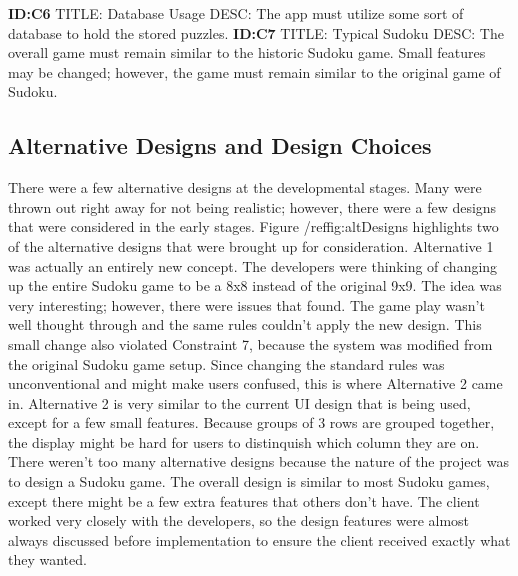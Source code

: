 \documentclass{article}
\begin{document}
\textbf{ID:C6} \newline TITLE: Database Usage \newline DESC: The app must utilize some sort of database to hold the stored puzzles.\newline\newline
\textbf{ID:C7} \newline TITLE: Typical Sudoku \newline DESC: The overall game must remain similar to the historic Sudoku game. Small features may be changed; however, the game must remain similar to the original game of Sudoku.\newline\newline


\subsection{Alternative Designs and Design Choices}
There were a few alternative designs at the developmental stages. Many were thrown out right away for not being realistic; however, there were a few designs that were considered in the early stages. Figure /ref{fig:altDesigns} highlights two of the alternative designs that were brought up for consideration. Alternative 1 was actually an entirely new concept. The developers were thinking of changing up the entire Sudoku game to be a 8x8 instead of the original 9x9. The idea was very interesting; however, there were issues that found. The game play wasn't well thought through and the same rules couldn't apply the new design. This small change also violated Constraint 7, because the system was modified from the original Sudoku game setup. Since changing the standard rules was unconventional and might make users confused, this is where Alternative 2 came in. Alternative 2 is very similar to the current UI design that is being used, except for a few small features. Because groups of 3 rows are grouped together, the display might be hard for users to distinquish which column they are on. There weren't too many alternative designs because the nature of the project was to design a Sudoku game. The overall design is similar to most Sudoku games, except there might be a few extra features that others don't have. The client worked very closely with the developers, so the design features were almost always discussed before implementation to ensure the client received exactly what they wanted.
\end{document}
